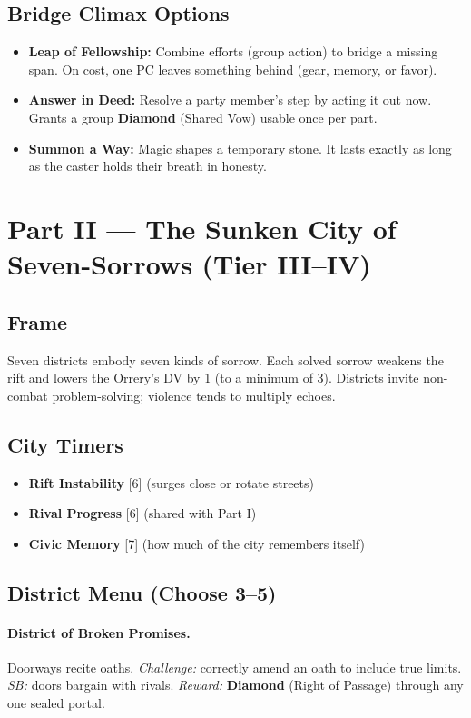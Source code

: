 \documentclass[11pt]{article}
\newcommand{\Clock}[2]{\textbf{#1} [#2]}
\newcommand{\Term}[1]{\textbf{#1}}
\newcommand{\Diamond}{\Term{Diamond}}
\begin{document}
\subsection*{Bridge Climax Options}
\begin{itemize}
\item \textbf{Leap of Fellowship:} Combine efforts (group action) to bridge a missing span. On cost, one PC leaves something behind (gear, memory, or favor).
\item \textbf{Answer in Deed:} Resolve a party member's step by acting it out now. Grants a group \Diamond{} (Shared Vow) usable once per part.
\item \textbf{Summon a Way:} Magic shapes a temporary stone. It lasts exactly as long as the caster holds their breath in honesty.
\end{itemize}

\section*{Part II --- The Sunken City of Seven-Sorrows (Tier III--IV)}

\subsection*{Frame}
Seven districts embody seven kinds of sorrow. Each solved sorrow weakens the rift and lowers the Orrery's DV by 1 (to a minimum of 3). Districts invite non-combat problem-solving; violence tends to multiply echoes.

\subsection*{City Timers}
\begin{itemize}
\item \Clock{Rift Instability}{6} (surges close or rotate streets)
\item \Clock{Rival Progress}{6} (shared with Part I)
\item \Clock{Civic Memory}{7} (how much of the city remembers itself)
\end{itemize}

\subsection*{District Menu (Choose 3--5)}
\paragraph{District of Broken Promises.} Doorways recite oaths. \emph{Challenge:} correctly amend an oath to include true limits. \emph{SB:} doors bargain with rivals. \emph{Reward:} \Diamond{} (Right of Passage) through any one sealed portal.
\end{document}
